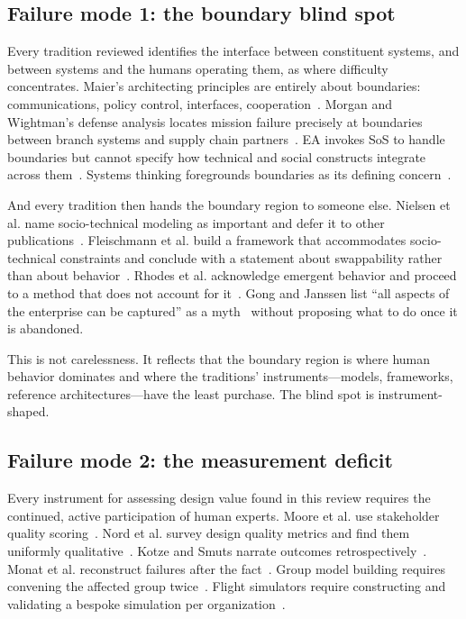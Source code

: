\documentclass[11pt,a4paper]{article}
\begin{document}
\subsection{Failure mode 1: the boundary blind spot}

Every tradition reviewed identifies the interface between constituent systems,
and between systems and the humans operating them, as where difficulty
concentrates. Maier's architecting principles are entirely about boundaries:
communications, policy control, interfaces, cooperation~\citep{maier1998}.
Morgan and Wightman's defense analysis locates mission failure precisely at
boundaries between branch systems and supply chain
partners~\citep{morgan2023}. EA invokes SoS to handle boundaries but cannot
specify how technical and social constructs integrate across
them~\citep{lapalme2012,nielsen2015}. Systems thinking foregrounds boundaries as
its defining concern~\citep{greene2017}.

And every tradition then hands the boundary region to someone else. Nielsen et
al. name socio-technical modeling as important and defer it to other
publications~\citep{nielsen2015}. Fleischmann et al. build a framework that
accommodates socio-technical constraints and conclude with a statement about
swappability rather than about behavior~\citep{fleischmann2016}. Rhodes et al.
acknowledge emergent behavior and proceed to a method that does not account for
it~\citep{rhodes2009}. Gong and Janssen list ``all aspects of the enterprise can
be captured'' as a myth~\citep{gong2019} without proposing what to do once it is
abandoned.

This is not carelessness. It reflects that the boundary region is where human
behavior dominates and where the traditions' instruments---models, frameworks,
reference architectures---have the least purchase. The blind spot is
instrument-shaped.

\subsection{Failure mode 2: the measurement deficit}

Every instrument for assessing design value found in this review requires the
continued, active participation of human experts. Moore et al. use stakeholder
quality scoring~\citep{moore2003}. Nord et al. survey design quality metrics and
find them uniformly qualitative~\citep{nord2014}. Kotze and Smuts narrate
outcomes retrospectively~\citep{kotze2016}. Monat et al. reconstruct failures
after the fact~\citep{monat2020}. Group model building requires convening the
affected group twice~\citep{hovmand2013,kunc2016}. Flight simulators require
constructing and validating a bespoke simulation per
organization~\citep{papageorgiou2008}.
\end{document}
